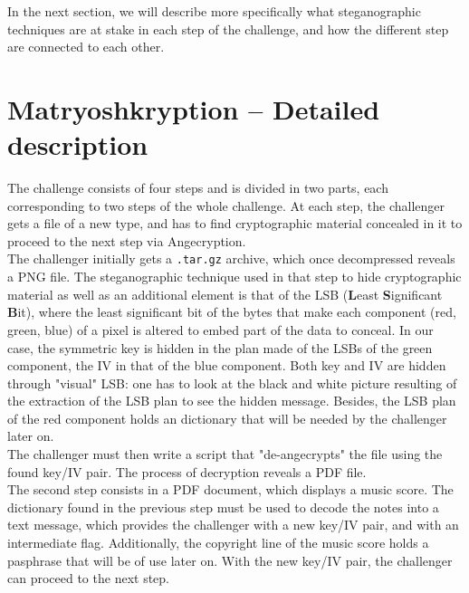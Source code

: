 \documentclass[12pt,a4paper]{article}
\begin{document}
    In the next section, we will describe more specifically what steganographic
    techniques are at stake in each step of the challenge, and how the different
    step are connected to each other.


\section*{Matryoshkryption -- Detailed description}
    The challenge consists of four steps and is divided in two parts, each
    corresponding to two steps of the whole challenge. At each step, the
    challenger gets a file of a new type, and has to find cryptographic
    material concealed in it to proceed to the next step via Angecryption.\\

    The challenger initially gets a \texttt{.tar.gz} archive, which once
    decompressed reveals a PNG file. The steganographic technique used in that
    step to hide cryptographic material as well as an additional element is
    that of the LSB (\textbf{L}east \textbf{S}ignificant \textbf{B}it), where
    the least significant bit of the bytes that make each component (red,
    green, blue) of a pixel is altered to embed part of the data to conceal. In
    our case, the symmetric key is hidden in the plan made of the LSBs of the
    green component, the IV in that of the blue component. Both key and IV are
    hidden through "visual" LSB: one has to look at the black and white picture
    resulting of the extraction of the LSB plan to see the hidden message.
    Besides, the LSB plan of the red component holds an dictionary that will be
    needed by the challenger later on.\\ \indent The challenger must then write
    a script that "de-angecrypts" the file using the found key/IV pair. The
    process of decryption reveals a PDF file.\\

    The second step consists in a PDF document, which displays a music score.
    The dictionary found in the previous step must be used to decode the notes
    into a text message, which provides the challenger with a new key/IV pair,
    and with an intermediate flag. Additionally, the copyright line of the
    music score holds a pasphrase that will be of use later on. With the new
    key/IV pair, the challenger can proceed to the next step.\\
\end{document}
